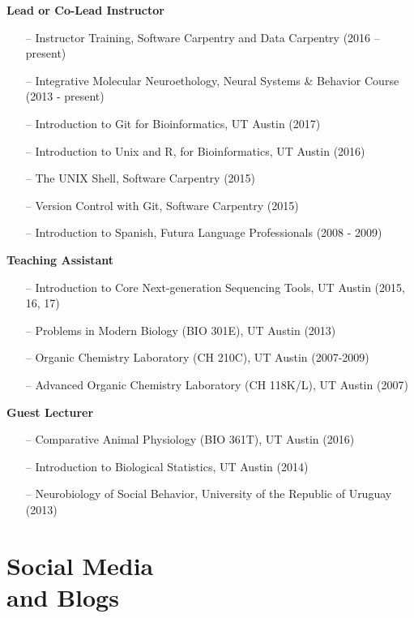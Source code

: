\documentclass[margin,line]{resume}
\begin{document}
\begin{resume}
\begin{itemize}
\end{itemize}

{\bf Lead or Co-Lead Instructor }
\begin{itemize}
\raggedright
\item[--] Instructor Training, Software Carpentry and Data Carpentry (2016 – present)
\item[--] Integrative Molecular Neuroethology, Neural Systems \& Behavior Course (2013 - present)
\item[--] Introduction to Git for Bioinformatics, UT Austin (2017)
\item[--] Introduction to Unix and R, for Bioinformatics, UT Austin (2016)
\item[--] The UNIX Shell, Software Carpentry (2015)
\item[--] Version Control with Git, Software Carpentry (2015)
\item[--] Introduction to Spanish, Futura Language Professionals (2008 - 2009)
\end{itemize}

{\bf Teaching Assistant}
\begin{itemize}
\item[--] Introduction to Core Next-generation Sequencing Tools, UT Austin (2015, 16, 17)
\item[--] Problems in Modern Biology (BIO 301E), UT Austin (2013)
\item[--] Organic Chemistry Laboratory (CH 210C), UT Austin (2007-2009)
\item[--] Advanced Organic Chemistry Laboratory (CH 118K/L), UT Austin (2007)
\end{itemize}

{\bf Guest Lecturer}
\begin{itemize}
\item[--] Comparative Animal Physiology (BIO 361T), UT Austin (2016)
\item[--] Introduction to Biological Statistics, UT Austin (2014)
\item[--] Neurobiology of Social Behavior, University of the Republic of Uruguay (2013)
\end{itemize}



\section{\mysidestyle Social Media\\and Blogs}


\end{resume}
\end{document}
